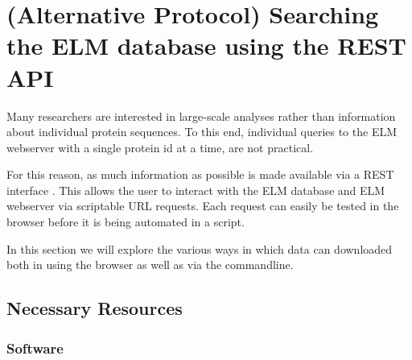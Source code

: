 \documentclass[12pt]{article}
\begin{document}
\clearpage

\section{(Alternative Protocol) Searching the ELM database using the REST API}
\label{sec:search_REST}

Many researchers are interested in large-scale analyses rather than
information about individual protein sequences. To this end, individual
queries to the ELM webserver with a single protein id at a time, are not
practical.

For this reason, as much information as possible is made available via a
REST interface \citep{Fielding2002}. This allows the user to interact
with the ELM database and ELM webserver via scriptable URL requests.
Each request can easily be tested in the browser before it is being
automated in a script.

In this section we will explore the various ways in which data can
downloaded both in using the browser as well as via the commandline.

%
%
\subsection*{Necessary Resources}
\subsubsection*{Software}

\end{document}
